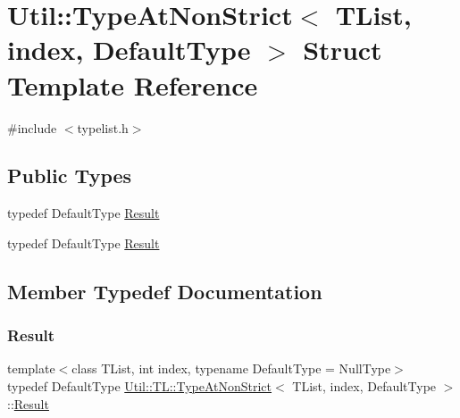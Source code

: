 \hypertarget{structUtil_1_1TL_1_1TypeAtNonStrict}{}\section{Util\+:\+:Type\+At\+Non\+Strict$<$ T\+List, index, Default\+Type $>$ Struct Template Reference}
\label{structUtil_1_1TL_1_1TypeAtNonStrict}


{\ttfamily \#include $<$typelist.\+h$>$}

\subsection*{Public Types}
\begin{DoxyCompactItemize}
\item 
typedef Default\+Type \mbox{\hyperlink{structUtil_1_1TL_1_1TypeAtNonStrict_a39b06fe5e93590ee7a8870acb2017521}{Result}}
\item 
typedef Default\+Type \mbox{\hyperlink{structUtil_1_1TL_1_1TypeAtNonStrict_a39b06fe5e93590ee7a8870acb2017521}{Result}}
\end{DoxyCompactItemize}


\subsection{Member Typedef Documentation}
\mbox{\label{structUtil_1_1TL_1_1TypeAtNonStrict_a39b06fe5e93590ee7a8870acb2017521}} 
\subsubsection{\texorpdfstring{Result}{Result}\hspace{0.1cm}{\footnotesize\ttfamily [1/2]}}
{\footnotesize\ttfamily template$<$class T\+List, int index, typename Default\+Type = Null\+Type$>$ \\
typedef Default\+Type \mbox{\hyperlink{structUtil_1_1TL_1_1TypeAtNonStrict}{Util\+::\+T\+L\+::\+Type\+At\+Non\+Strict}}$<$ T\+List, index, Default\+Type $>$\+::\mbox{\hyperlink{structUtil_1_1TL_1_1TypeAtNonStrict_a39b06fe5e93590ee7a8870acb2017521}{Result}}}

